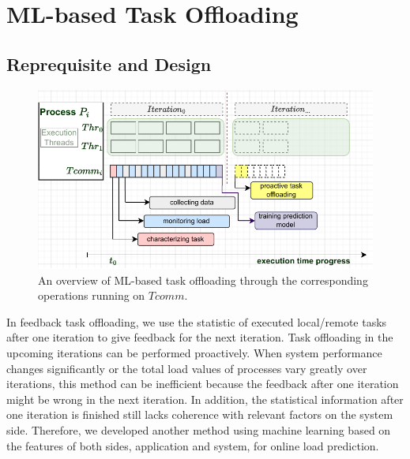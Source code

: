 \section{ML-based Task Offloading}
\label{sec:PADLB-MLbasedTaskOffload}

\subsection{Reprequisite and Design} \label{subsec:ml-based-design}

\begin{figure}[t]
	\centering
	\includegraphics[scale=0.65]{./pictures/padlb_approach/padlb_mlbased_lb_idea.pdf}
	\caption{An overview of ML-based task offloading through the corresponding operations running on $Tcomm$.}
	\label{fig:padlb_mlbased_taskoffload_scheme}
\end{figure}

In feedback task offloading, we use the statistic of executed local/remote tasks after one iteration to give feedback for the next iteration. Task offloading in the upcoming iterations can be performed proactively. When system performance changes significantly or the total load values of processes vary greatly over iterations, this method can be inefficient because the feedback after one iteration might be wrong in the next iteration. In addition, the statistical information after one iteration is finished still lacks coherence with relevant factors on the system side. Therefore, we developed another method using machine learning based on the features of both sides, application and system, for online load prediction.\\

